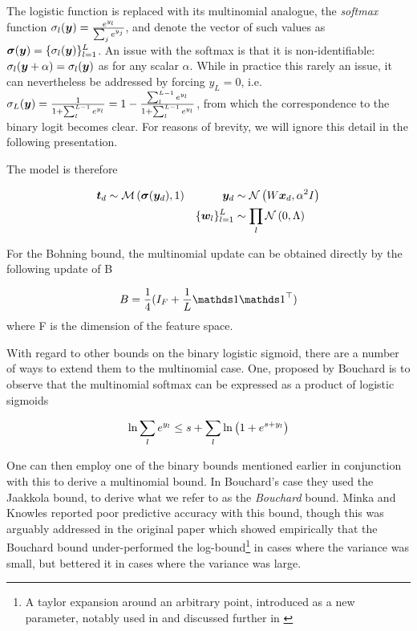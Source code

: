 The logistic function is replaced with its multinomial analogue, the \emph{softmax} function $\sigma_l(\bm y) = \frac{e^{y_l}}{\sum_j e^{y_j}}$, and denote the vector of such values as $\bm \sigma(\bm y) = \{ \sigma_l(\bm y) \}_{l=1}^{L}$. An issue with the softmax is that it is non-identifiable: $\sigma_l (\bm y + \alpha) = \sigma_l(\bm y)$ as for any scalar $\alpha$. While in practice this rarely an issue, it can nevertheless be addressed by forcing $y_L = 0$, i.e. $\sigma_L(\bm y) = \frac{1}{1 + \sum_l^{L-1} e^{y_l}} = 1 - \frac{\sum_l^{L-1} e^{y_l}}{1 + \sum_l^{L-1} e^{y_l}}$, from which the correspondence to the binary logit becomes clear. For reasons of brevity, we will ignore this detail in the following presentation.

The model is therefore

\begin{align}
\bm t_d & \sim \mathcal{M} \left( {\bm \sigma(\bm y_d)},{1} \right) & \bm y_d & \sim \mathcal{N} \left( {W \bm x_d}, {\alpha^2 I} \right) \\
 & & \{\bm w_l\}_{l = 1}^{L} & \sim \prod_l \mathcal{N} \left( {0}, {\Lambda} \right)
\end{align}

For the Bohning bound, the multinomial update can be obtained directly by the following update of B\cite{BohningLogReg1988}

\begin{equation}
B = \frac{1}{4} (I_F + \frac{1}{L}\one \one\T)
\end{equation}
where F is the dimension of the feature space.

With regard to other bounds on the binary logistic sigmoid, there are a number of ways to extend them to the multinomial case. One, proposed by Bouchard\cite{Bouchard2007} is to observe that the multinomial softmax can be expressed as a product of logistic sigmoids

\begin{equation}
\ln \sum_l e^{y_l} \leq s + \sum_l { \ln \left( 1 + e^{ s + y_l } \right) }
\end{equation}

One can then employ one of the binary bounds mentioned earlier in conjunction with this to derive a multinomial bound. In Bouchard's case they used the Jaakkola bound, to derive what we refer to as the \emph{Bouchard} bound. Minka and Knowles reported poor predictive accuracy with this bound\cite{MinkaKnowles}, though this was arguably addressed in the original paper which showed empirically that the Bouchard bound under-performed the log-bound\footnote{A taylor expansion around an arbitrary point, introduced as a new parameter, notably used in\cite{Blei2006} and discussed further in \cite{Wang2013a}} in cases where the variance was small, but bettered it in cases where the variance was large.

